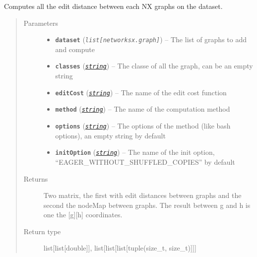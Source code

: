 \documentclass[letterpaper,10pt,english]{sphinxmanual}
\begin{document}
\begin{fulllineitems}
\label{doc:PythonGedLib.computeEditDistanceOnNxGraphs}
Computes all the edit distance between each NX graphs on the dataset.
\begin{quote}\begin{description}
\item[{Parameters}] \leavevmode\begin{itemize}
\item {} 
\textbf{\texttt{dataset}} (\emph{\texttt{list{[}networksx.graph{]}}}) -- The list of graphs to add and compute

\item {} 
\textbf{\texttt{classes}} (\href{https://docs.python.org/3/library/string.html\#module-string}{\emph{\texttt{string}}}) -- The classe of all the graph, can be an empty string

\item {} 
\textbf{\texttt{editCost}} (\href{https://docs.python.org/3/library/string.html\#module-string}{\emph{\texttt{string}}}) -- The name of the edit cost function

\item {} 
\textbf{\texttt{method}} (\href{https://docs.python.org/3/library/string.html\#module-string}{\emph{\texttt{string}}}) -- The name of the computation method

\item {} 
\textbf{\texttt{options}} (\href{https://docs.python.org/3/library/string.html\#module-string}{\emph{\texttt{string}}}) -- The options of the method (like bash options), an empty string by default

\item {} 
\textbf{\texttt{initOption}} (\href{https://docs.python.org/3/library/string.html\#module-string}{\emph{\texttt{string}}}) -- The name of the init option, ``EAGER\_WITHOUT\_SHUFFLED\_COPIES'' by default

\end{itemize}

\item[{Returns}] \leavevmode
Two matrix, the first with edit distances between graphs and the second the nodeMap between graphs. The result between g and h is one the {[}g{]}{[}h{]} coordinates.

\item[{Return type}] \leavevmode
list{[}list{[}double{]}{]}, list{[}list{[}list{[}tuple(size\_t, size\_t){]}{]}{]}


\end{description}
\end{quote}
\end{fulllineitems}
\end{document}
